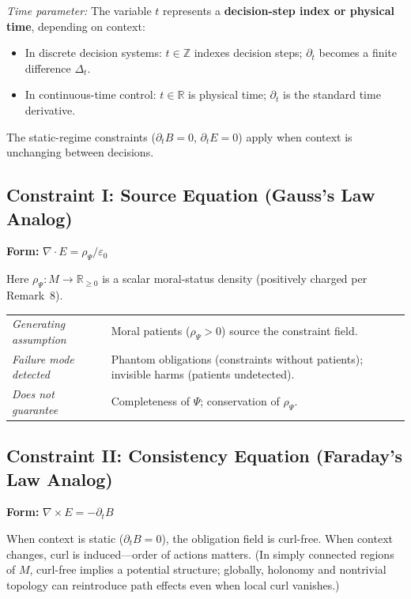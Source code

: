 \documentclass[12pt]{article}
\begin{document}
\emph{Time parameter:} The variable $t$ represents a \textbf{decision-step index or physical time}, depending on context:
\begin{itemize}
\item In discrete decision systems: $t \in \mathbb{Z}$ indexes decision steps; $\partial_t$ becomes a finite difference $\Delta_t$.
\item In continuous-time control: $t \in \mathbb{R}$ is physical time; $\partial_t$ is the standard time derivative.
\end{itemize}

The static-regime constraints ($\partial_t B = 0$, $\partial_t E = 0$) apply when context is unchanging between decisions.

\subsection{Constraint I: Source Equation (Gauss's Law Analog)}

\textbf{Form:} $\nabla \cdot E = \rho_\Psi / \varepsilon_0$

Here $\rho_\Psi : M \to \mathbb{R}_{\geq 0}$ is a scalar moral-status density (positively charged per Remark~8).

\begin{table}[h]
\centering
\begin{tabular}{ll}
\emph{Generating assumption} & Moral patients ($\rho_\Psi > 0$) source the constraint field. \\
\emph{Failure mode detected} & Phantom obligations (constraints without patients); invisible harms (patients undetected). \\
\emph{Does not guarantee} & Completeness of $\Psi$; conservation of $\rho_\Psi$. \\
\end{tabular}
\end{table}

\subsection{Constraint II: Consistency Equation (Faraday's Law Analog)}

\textbf{Form:} $\nabla \times E = -\partial_t B$

When context is static ($\partial_t B = 0$), the obligation field is curl-free. When context changes, curl is
induced---order of actions matters. (In simply connected regions of $M$, curl-free implies a potential
structure; globally, holonomy and nontrivial topology can reintroduce path effects even when local
curl vanishes.)
\end{document}
